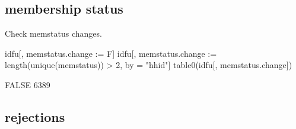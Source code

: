 \subsection{membership status}

Check \textsf{memstatus} changes. 
\begin{Schunk}
\begin{Sinput}
idfu[, memstatus.change := F]
idfu[, memstatus.change := length(unique(memstatus)) > 2, by = "hhid"]
table0(idfu[, memstatus.change])
\end{Sinput}
\begin{Soutput}
FALSE 
 6389 
\end{Soutput}
\end{Schunk}

\subsection{rejections}

